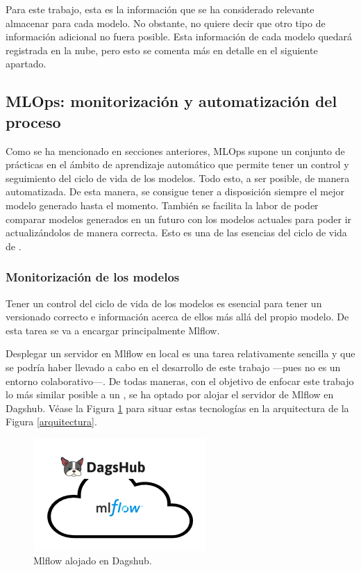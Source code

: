 Para este trabajo, esta es la información que se ha considerado relevante almacenar para cada modelo. No obstante, no quiere decir que otro tipo de información adicional no fuera posible. Esta información de cada modelo quedará registrada en la nube, pero esto se comenta más en detalle en el siguiente apartado.

\subsection{MLOps: monitorización y automatización del proceso}
Como se ha mencionado en secciones anteriores, MLOps supone un conjunto de prácticas en el ámbito de aprendizaje automático que permite tener un control y seguimiento del ciclo de vida de los modelos. Todo esto, a ser posible, de  manera automatizada. De esta manera, se consigue tener a disposición siempre el mejor modelo generado hasta el momento. También se facilita la labor de poder comparar modelos generados en un futuro con los modelos actuales para poder ir actualizándolos de manera correcta. Esto es una de las esencias del ciclo de vida de .

\subsubsection{Monitorización de los modelos}
Tener un control del ciclo de vida de los modelos es esencial para tener un versionado correcto e información acerca de ellos más allá del propio modelo. De esta tarea se va a encargar principalmente Mlflow. 

Desplegar un servidor en Mlflow en local es una tarea relativamente sencilla y que se podría haber llevado a cabo en el desarrollo de este trabajo ---pues no es un entorno colaborativo---. De todas maneras, con el objetivo de enfocar este trabajo lo más similar posible a un , se ha optado por alojar el servidor de Mlflow en Dagshub. Véase la Figura \ref{MLOps} para situar estas tecnologías en la arquitectura de la Figura \ref{arquitectura}.

\begin{figure}[H]
    \centering
    \includegraphics[scale = 0.95]{imgs/MLOps.png}
    \caption{Mlflow alojado en Dagshub.}
    \label{MLOps}
\end{figure}

